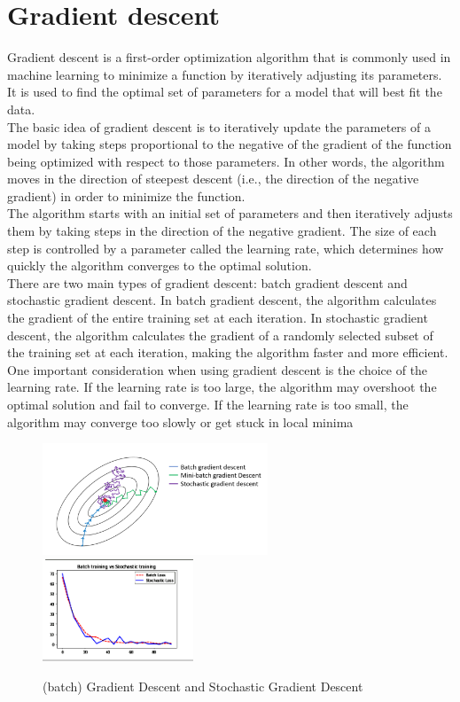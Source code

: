 \documentclass{article}
\begin{document}
\section{Gradient descent}
Gradient descent is a first-order optimization algorithm that is commonly used in machine learning to minimize a function by iteratively adjusting its parameters.\\
It is used to find the optimal set of parameters for a model that will best fit the data.\\
The basic idea of gradient descent is to iteratively update the parameters of a model by taking steps proportional to the negative of the gradient of the function being optimized with respect to those parameters. In other words, the algorithm moves in the direction of steepest descent (i.e., the direction of the negative gradient) in order to minimize the function.\\
The algorithm starts with an initial set of parameters and then iteratively adjusts them by taking steps in the direction of the negative gradient. The size of each step is controlled by a parameter called the learning rate, which determines how quickly the algorithm converges to the optimal solution.\\
There are two main types of gradient descent: batch gradient descent and stochastic gradient descent. In batch gradient descent, the algorithm calculates the gradient of the entire training set at each iteration. In stochastic gradient descent, the algorithm calculates the gradient of a randomly selected subset of the training set at each iteration, making the algorithm faster and more efficient.\\
One important consideration when using gradient descent is the choice of the learning rate. If the learning rate is too large, the algorithm may overshoot the optimal solution and fail to converge. If the learning rate is too small, the algorithm may converge too slowly or get stuck in local minima
\begin{figure}[!ht]
\includegraphics[width=0.6\textwidth]{images/img0.png}
\includegraphics[width=0.4\textwidth]{images/img1.png}
\caption{(batch) Gradient Descent and Stochastic Gradient Descent}
\end{figure}
\end{document}
